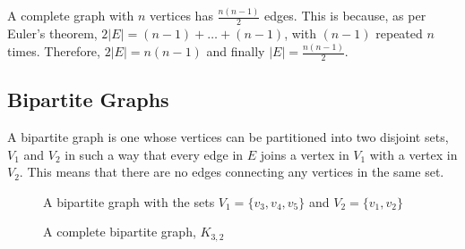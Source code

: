 A complete graph with $n$ vertices has $\frac{n(n - 1)}{2}$ edges. This is because, as per Euler's theorem,
 $2 \lvert E \rvert = (n - 1) + \ldots + (n - 1)$, with $(n - 1)$ repeated $n$ times. Therefore,
 $2 \lvert E \rvert = n(n - 1)$ and finally $\lvert E \rvert = \frac{n(n - 1)}{2}$.

\subsection*{Bipartite Graphs}

A bipartite graph is one whose vertices can be partitioned into two disjoint sets, $V_1$ and $V_2$ in such a way that
 every edge in $E$ joins a vertex in $V_1$ with a vertex in $V_2$. This means that there are no edges connecting any
 vertices in the same set.

\begin{minipage}[c]{0.45\linewidth}
  \begin{figure}[H]
    \centering
    \usetikzlibrary{graphs}
    \caption{A bipartite graph with the sets $V_1 = \{v_3, v_4, v_5\}$ and $V_2 = \{v_1, v_2\}$}
    \label{fig:graph3}
  \end{figure}
\end{minipage}\hfill
\begin{minipage}[c]{0.45\linewidth}
  \begin{figure}[H]
    \centering
    \usetikzlibrary{graphs}
    \caption{A complete bipartite graph, $K_{3,2}$}
    \label{fig:graph4}
  \end{figure}
\end{minipage}

